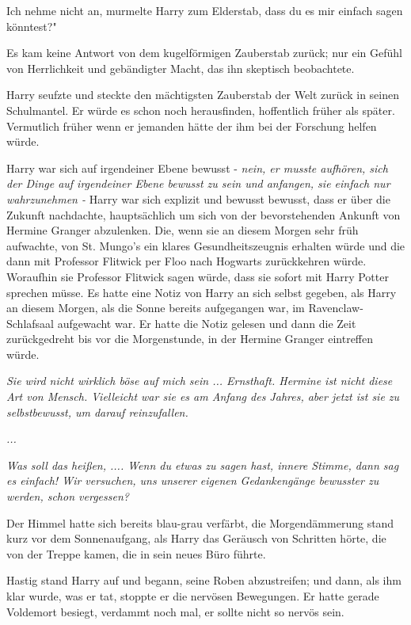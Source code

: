 \glqq Ich nehme nicht an\grqq{}, murmelte Harry zum Elderstab, \glqq dass du es
mir einfach sagen könntest?"

Es kam keine Antwort von dem kugelförmigen Zauberstab zurück; nur ein Gefühl von
Herrlichkeit und gebändigter Macht, das ihn skeptisch beobachtete.

Harry seufzte und steckte den mächtigsten Zauberstab der Welt zurück in seinen
Schulmantel. Er würde es schon noch herausfinden, hoffentlich früher als später.
Vermutlich früher wenn er jemanden hätte der ihm bei der Forschung helfen würde.

Harry war sich auf irgendeiner Ebene bewusst -\emph{ nein, er musste aufhören,
sich der Dinge auf irgendeiner Ebene bewusst zu sein und anfangen, sie einfach
nur wahrzunehmen -} Harry war sich explizit und bewusst bewusst, dass er über
die Zukunft nachdachte, hauptsächlich um sich von der bevorstehenden Ankunft von
Hermine Granger abzulenken. Die, wenn sie an diesem Morgen sehr früh aufwachte,
von St. Mungo's ein klares Gesundheitszeugnis erhalten würde und die dann mit
Professor Flitwick per Floo nach Hogwarts zurückkehren würde. Woraufhin sie
Professor Flitwick sagen würde, dass sie sofort mit Harry Potter sprechen müsse.
Es hatte eine Notiz von Harry an sich selbst gegeben, als Harry an diesem
Morgen, als die Sonne bereits aufgegangen war, im Ravenclaw-Schlafsaal
aufgewacht war. Er hatte die Notiz gelesen und dann die Zeit zurückgedreht bis
vor die Morgenstunde, in der Hermine Granger eintreffen würde.

\emph{Sie wird nicht wirklich böse auf mich sein ... Ernsthaft. Hermine ist nicht diese Art von Mensch. Vielleicht war sie es am Anfang des Jahres, aber jetzt ist sie zu selbstbewusst, um darauf reinzufallen. }

\emph{... }

\emph{Was soll das heißen, \glqq ...\grqq{}. Wenn du etwas zu sagen hast, innere
Stimme, dann sag es einfach! Wir versuchen, uns unserer eigenen Gedankengänge
bewusster zu werden, schon vergessen?}

Der Himmel hatte sich bereits blau-grau verfärbt, die Morgendämmerung stand kurz
vor dem Sonnenaufgang, als Harry das Geräusch von Schritten hörte, die von der
Treppe kamen, die in sein neues Büro führte.

Hastig stand Harry auf und begann, seine Roben abzustreifen; und dann, als ihm
klar wurde, was er tat, stoppte er die nervösen Bewegungen. Er hatte gerade
Voldemort besiegt, verdammt noch mal, er sollte nicht so nervös sein.

